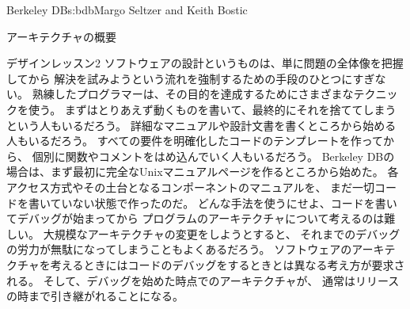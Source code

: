 \begin{aosachapter}{Berkeley DB}{s:bdb}{Margo Seltzer and Keith Bostic}
\begin{aosasect1}{アーキテクチャの概要}
\begin{aosabox}{デザインレッスン2}
ソフトウェアの設計というものは、単に問題の全体像を把握してから
解決を試みようという流れを強制するための手段のひとつにすぎない。
熟練したプログラマーは、その目的を達成するためにさまざまなテクニックを使う。
まずはとりあえず動くものを書いて、最終的にそれを捨ててしまうという人もいるだろう。
詳細なマニュアルや設計文書を書くところから始める人もいるだろう。
すべての要件を明確化したコードのテンプレートを作ってから、
個別に関数やコメントをはめ込んでいく人もいるだろう。
Berkeley DBの場合は、まず最初に完全なUnixマニュアルページを作るところから始めた。
各アクセス方式やその土台となるコンポーネントのマニュアルを、
まだ一切コードを書いていない状態で作ったのだ。
どんな手法を使うにせよ、コードを書いてデバッグが始まってから
プログラムのアーキテクチャについて考えるのは難しい。
大規模なアーキテクチャの変更をしようとすると、
それまでのデバッグの労力が無駄になってしまうこともよくあるだろう。
ソフトウェアのアーキテクチャを考えるときにはコードのデバッグをするときとは異なる考え方が要求される。
そして、デバッグを始めた時点でのアーキテクチャが、
通常はリリースの時まで引き継がれることになる。

\end{aosabox}



\end{aosasect1}
\end{aosachapter}
